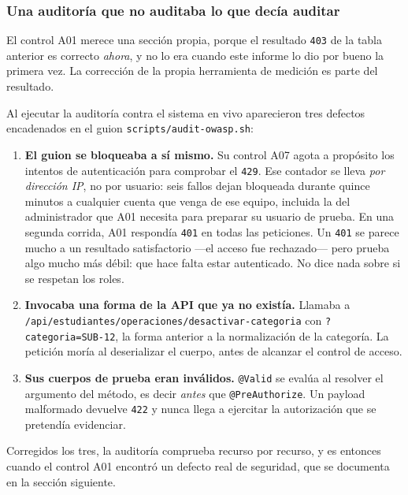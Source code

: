 \documentclass[11pt,a4paper]{article}
\newcommand{\ruta}[1]{\texttt{\footnotesize #1}}
\begin{document}
\subsubsection{Una auditoría que no auditaba lo que decía auditar}
\label{sec:a01-falso-correcto}

El control A01 merece una sección propia, porque el resultado
\texttt{403} de la tabla anterior es correcto \emph{ahora}, y no lo era
cuando este informe lo dio por bueno la primera vez. La corrección de la
propia herramienta de medición es parte del resultado.

Al ejecutar la auditoría contra el sistema en vivo aparecieron tres
defectos encadenados en el guion \ruta{scripts/audit-owasp.sh}:

\begin{enumerate}[leftmargin=*]
  \item \textbf{El guion se bloqueaba a sí mismo.} Su control A07 agota a
    propósito los intentos de autenticación para comprobar el \texttt{429}.
    Ese contador se lleva \emph{por dirección IP}, no por usuario: seis
    fallos dejan bloqueada durante quince minutos a cualquier cuenta que
    venga de ese equipo, incluida la del administrador que A01 necesita
    para preparar su usuario de prueba. En una segunda corrida, A01
    respondía \texttt{401} en todas las peticiones. Un \texttt{401} se
    parece mucho a un resultado satisfactorio —el acceso fue rechazado—
    pero prueba algo mucho más débil: que hace falta estar autenticado. No
    dice nada sobre si se respetan los roles.
  \item \textbf{Invocaba una forma de la API que ya no existía.} Llamaba a
    \ruta{/api/estudiantes/operaciones/desactivar-categoria} con
    \texttt{?categoria=SUB-12}, la forma anterior a la normalización de la
    categoría. La petición moría al deserializar el cuerpo, antes de
    alcanzar el control de acceso.
  \item \textbf{Sus cuerpos de prueba eran inválidos.} \texttt{@Valid} se
    evalúa al resolver el argumento del método, es decir \emph{antes} que
    \texttt{@PreAuthorize}. Un payload malformado devuelve \texttt{422} y
    nunca llega a ejercitar la autorización que se pretendía evidenciar.
\end{enumerate}

Corregidos los tres, la auditoría comprueba recurso por recurso, y es
entonces cuando el control A01 encontró un defecto real de seguridad, que
se documenta en la sección siguiente.
\end{document}
